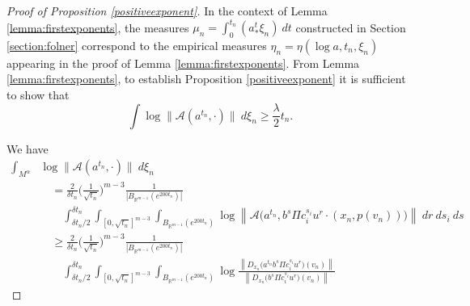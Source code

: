 \documentclass[10pt,reqno]{amsart}
\theoremstyle{Theorem}
\theoremstyle{definition}
\theoremstyle{remark}
\def\Fib{\mathrm{Fiber}}
\newcommand{\R}{\mathbb {R}}
\newcommand{\inv}{^{-1}}
\def\calA{\mathcal A}
\def\red{\color{red}}
\def\blue{}
\begin{document}
{\begin{proof}[Proof of Proposition \ref{positiveexponent}]
In the context of  Lemma \ref{lemma:firstexponents}, the measures $\mu_n= \int_0^{t_n} (a^t_*\xi_n ) \ d t$ constructed in Section \ref{section:folner} correspond to the empirical measures $\eta_n= \eta(\log a, t_n, \xi_n)$ appearing in the proof of Lemma \ref{lemma:firstexponents}.  From Lemma \ref{lemma:firstexponents}, to establish
 Proposition \ref{positiveexponent} it is sufficient to show that
$$\int \log  \|\calA(a ^{t_n},\cdot) \|  \ d \xi_n %
\geq \frac{\lambda}{2} t_n.$$

We have
\begin{equation*}
\begin{aligned}
 \int_{M^\alpha }  & {\blue  \log  \|\calA(a ^{t_n},\cdot) \|  \ d \xi_n} \\
&\quad  ={  \frac{2}{\delta t_n}\bigg(\frac{1}{\sqrt{t_n}} }\bigg)^{m-3}\frac{ 1}{|B_{\R^{m-1}}(e^{200t_n})|}
\\ &\quad   \quad
    \int_{\delta t_n /2}^{\delta t_n} \int_{[0, \sqrt{t_n}]^{m-3}}
\int_{B_{\R^{m-1}}(e^{200t_n})}
{\blue \log \left\| \calA\big(  a^{t_n}, b^s\Pi  c_i^{s_i}u^r \cdot (x_n, p(v_n) )\big) \right\|\  dr \ ds_i \ d s}\\
&\quad  \ge
{  \frac{2}{\delta t_n}\bigg(\frac{1}{\sqrt{t_n}} }\bigg)^{m-3}\frac{ 1}{|B_{\R^{m-1}}(e^{200t_n})|}
\\ &\quad \quad
    \int_{\delta t_n /2}^{\delta t_n} \int_{[0, \sqrt{t_n}]^{m-3}}
\int_{B_{\R^{m-1}}(e^{200t_n})}
\log \frac{\left \| D_{ x_n  } \big( a^{t_n} b^s\Pi  c_i^{s_i}u^r\big) ( v_n)\right  \|    }{\left \| D_{ x_n  } \big(   b^s\Pi  c_i^{s_i}u^r\big) ( v_n) \right  \|  }

\end{aligned}
\end{equation*}
\end{proof}}
\end{document}
